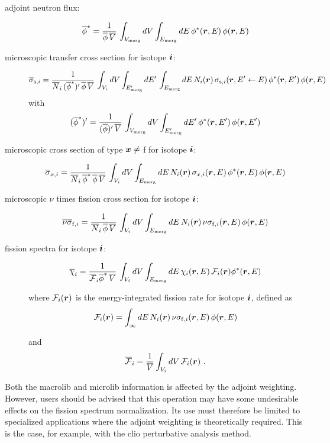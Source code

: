 \begin{description}

\item[adjoint neutron flux:]
$$
\overline\phi^* = {1\over \overline\phi\, \overline V} \, \int_{V_{\rm merg}} dV \int_{E_{\rm merg}} dE \, \phi^*(\bff(r),E)\, \phi(\bff(r),E)
$$

\item[microscopic transfer cross section for isotope $\bff(i)$:]
$$
\overline \sigma_{{\rm s},i} ={ 1 \over \overline N_i\, (\overline\phi^*)' \, \overline\phi \, \overline V} \, \int_{V_i} dV \int_{E'_{\rm merg}} dE' \,\int_{E_{\rm merg}} dE \, N_i(\bff(r)) \, \sigma_{{\rm s},i}(\bff(r),E' \leftarrow E) \, \phi^*(\bff(r),E') \, \phi(\bff(r),E)
$$
\noindent with
$$
(\overline\phi^*)' = {1\over (\overline\phi)' \, \overline V} \, \int_{V_{\rm merg}} dV \int_{E'_{\rm merg}} dE' \, \phi^*(\bff(r),E')\, \phi(\bff(r),E')
$$

\item[microscopic cross section of type $\bff(x)\neq$ f for isotope $\bff(i)$:]
$$
\overline \sigma_{x,i} ={ 1 \over \overline N_i\, \overline\phi^* \, \overline\phi \, \overline V} \, \int_{V_i} dV \int_{E_{\rm merg}} dE \, N_i(\bff(r)) \, \sigma_{x,i}(\bff(r),E) \, \phi^*(\bff(r),E) \, \phi(\bff(r),E)
$$

\item[microscopic $\nu$ times fission cross section for isotope $\bff(i)$:]
$$
\overline\nu\overline\sigma_{{\rm f},i} ={ 1 \over \overline N_i\, \overline\phi \, \overline V} \, \int_{V_i} dV \int_{E_{\rm merg}} dE \, N_i(\bff(r)) \, \nu\sigma_{{\rm f},i}(\bff(r),E) \, \phi(\bff(r),E)
$$

\item[fission spectra for isotope $\bff(i)$:]
$$
\overline\chi_{i} ={ 1 \over \overline{\cal F}_i \overline\phi^* \, \overline V} \, \int_{V_i} dV \int_{E_{\rm merg}} dE \, \chi_{i}(\bff(r),E) \, {\cal F}_i(\bff(r)) \phi^*(\bff(r),E)
$$

\noindent where ${\cal F}_i(\bff(r))$ is the energy-integrated fission rate for isotope $\bff(i)$, defined as
$$
{\cal F}_i(\bff(r))=\int_\infty dE \, N_i(\bff(r)) \, \nu\sigma_{{\rm f},i}(\bff(r),E) \, \phi(\bff(r),E)
$$

\noindent and
$$
\overline{\cal F}_i={1\over \overline V} \int_{V_i} dV \, {\cal F}_i(\bff(r)) \ .
$$
\end{description}

Both the macrolib and microlib information is affected by the adjoint weighting. However, users should be advised that this operation may have some
undesirable effects on the fission spectrum normalization. Its use must therefore be limited to specialized applications where the adjoint weighting
is theoretically required. This is the case, for example, with the {\sc clio} perturbative analysis method.\cite{clio}

\eject

